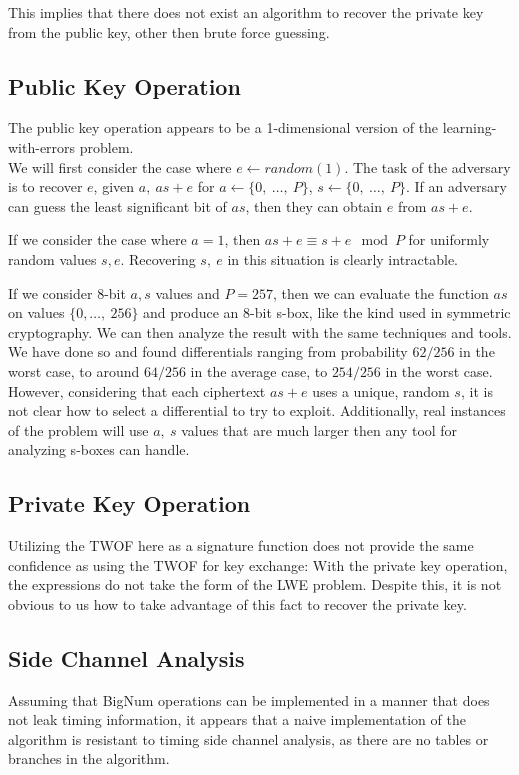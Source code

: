 \documentclass[preprint]{iacrtrans}
\begin{document}
This implies that there does not exist an algorithm to recover the private key from the public key, other then brute force guessing.

\subsection{Public Key Operation}
The public key operation appears to be a 1-dimensional version of the learning-with-errors problem.\\

We will first consider the case where $e \leftarrow random(1)$. The task of the adversary is to recover $e$, given $a,\ a s + e$ for $a \leftarrow \{0,\ \dots,\ P\}$, $s \leftarrow \{0,\ \dots,\ P\}$. If an adversary can guess the least significant bit of $a s$, then they can obtain $e$ from $a s + e$.

If we consider the case where $a = 1$, then $a s + e \equiv s + e \mod P$ for uniformly random values $s, e$. Recovering $s,\ e$ in this situation is clearly intractable.

If we consider 8-bit $a, s$ values and $P = 257$, then we can evaluate the function $a s$ on values $\{0,\dots,\ 256\}$ and produce an 8-bit s-box, like the kind used in symmetric cryptography. We can then analyze the result with the same techniques and tools. We have done so and found differentials ranging from probability $62/256$ in the worst case, to around $64/256$ in the average case, to $254/256$ in the worst case. However, considering that each ciphertext $a s + e$ uses a unique, random $s$, it is not clear how to select a differential to try to exploit. Additionally, real instances of the problem will use $a,\ s$ values that are much larger then any tool for analyzing s-boxes can handle.

\subsection{Private Key Operation}
Utilizing the TWOF here as a signature function does not provide the same confidence as using the TWOF for key exchange: With the private key operation, the expressions do not take the form of the LWE problem. Despite this, it is not obvious to us how to take advantage of this fact to recover the private key.

\subsection{Side Channel Analysis}
Assuming that BigNum operations can be implemented in a manner that does not leak timing information, it appears that a naive implementation of the algorithm is resistant to timing side channel analysis, as there are no tables or branches in the algorithm.
\end{document}
